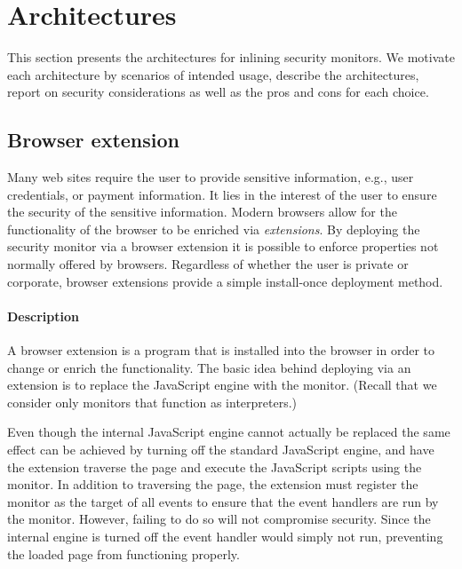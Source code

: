 \documentclass{llncs}
\begin{document}


\section{Architectures}
\label{sec:arch}
\vspace{-.04cm}
This section presents the architectures for inlining
security monitors. We motivate each architecture by scenarios of
intended usage, describe the architectures, report on
security considerations as well as the pros and cons for each choice.




\subsection{Browser extension}\label{sec:arch:ext}

Many web sites require the user to provide sensitive information, e.g., user
credentials, or payment information. It lies in the interest of the user to
ensure the security of the sensitive information.  Modern browsers allow for
the functionality of the browser to be enriched via \emph{extensions}. By
deploying the security monitor via a browser extension it is possible to enforce
properties not normally offered by browsers.  Regardless of whether the user is
private or corporate, browser extensions provide a simple 
install-once deployment method.


\paragraph{Description}

A browser extension is a program that is installed into the browser in order to
change or enrich the functionality.  The basic idea behind
deploying via an extension is to replace the JavaScript engine with the monitor.
(Recall that we consider only monitors that function as interpreters.)

Even though the internal JavaScript engine cannot actually be replaced the same
effect can be achieved by turning off the standard JavaScript engine, and have
the extension traverse the page and execute the JavaScript scripts
using the monitor. 
In addition to traversing the page, the extension must register the monitor as the target of
all events to ensure that the event handlers are run by the monitor. However, failing to
do so will not compromise security. Since the internal engine is turned off
the event handler would simply not run, preventing the loaded page from functioning
properly.
\end{document}

